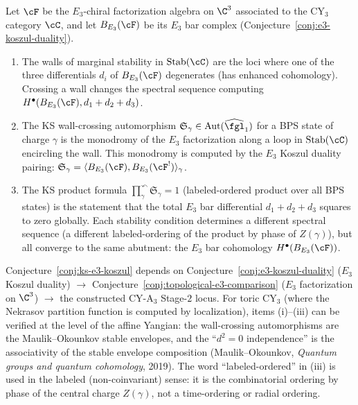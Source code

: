 \begin{conjecture}
\label{conj:ks-e3-koszul}
\ClaimStatusConjectured
Let $\cF$ be the $E_3$-chiral factorization algebra on $\C^3$ associated to the CY$_3$ category $\cC$, and let $B_{E_3}(\cF)$ be its $E_3$ bar complex (Conjecture~\ref{conj:e3-koszul-duality}).
\begin{enumerate}[label=\textup{(\roman*)}]
 \item The walls of marginal stability in $\mathrm{Stab}(\cC)$ are the loci where one of the three differentials $d_i$ of $B_{E_3}(\cF)$ degenerates (has enhanced cohomology). Crossing a wall changes the spectral sequence computing $H^\bullet(B_{E_3}(\cF), d_1 + d_2 + d_3)$.
 \item The KS wall-crossing automorphism $\mathfrak{S}_\gamma \in \mathrm{Aut}(\widehat{\fgl}_1)$ for a BPS state of charge $\gamma$ is the monodromy of the $E_3$ factorization along a loop in $\mathrm{Stab}(\cC)$ encircling the wall. This monodromy is computed by the $E_3$ Koszul duality pairing: $\mathfrak{S}_\gamma = \langle B_{E_3}(\cF), B_{E_3}(\cF^!) \rangle_\gamma$.
 \item The KS product formula $\prod_{\gamma}^{\curvearrowleft} \mathfrak{S}_\gamma = 1$ (labeled-ordered product over all BPS states) is the statement that the total $E_3$ bar differential $d_1 + d_2 + d_3$ squares to zero globally. Each stability condition determines a different spectral sequence (a different labeled-ordering of the product by phase of $Z(\gamma)$), but all converge to the same abutment: the $E_3$ bar cohomology $H^\bullet(B_{E_3}(\cF))$.
\end{enumerate}
\end{conjecture}

\begin{remark}
\label{rem:ks-e3-conditionality}
Conjecture~\ref{conj:ks-e3-koszul} depends on Conjecture~\ref{conj:e3-koszul-duality} ($E_3$ Koszul duality) $\to$ Conjecture~\ref{conj:topological-e3-comparison} ($E_3$ factorization on $\C^3$) $\to$ the constructed CY-A$_3$ Stage-$2$ locus. For toric CY$_3$ (where the Nekrasov partition function is computed by localization), items (i)--(iii) can be verified at the level of the affine Yangian: the wall-crossing automorphisms are the Maulik--Okounkov stable envelopes, and the ``$d^2 = 0$ independence'' is the associativity of the stable envelope composition (Maulik--Okounkov, \emph{Quantum groups and quantum cohomology}, 2019). The word ``labeled-ordered'' in (iii) is used in the labeled (non-coinvariant) sense: it is the combinatorial ordering by phase of the central charge $Z(\gamma)$, not a time-ordering or radial ordering.
\end{remark}


